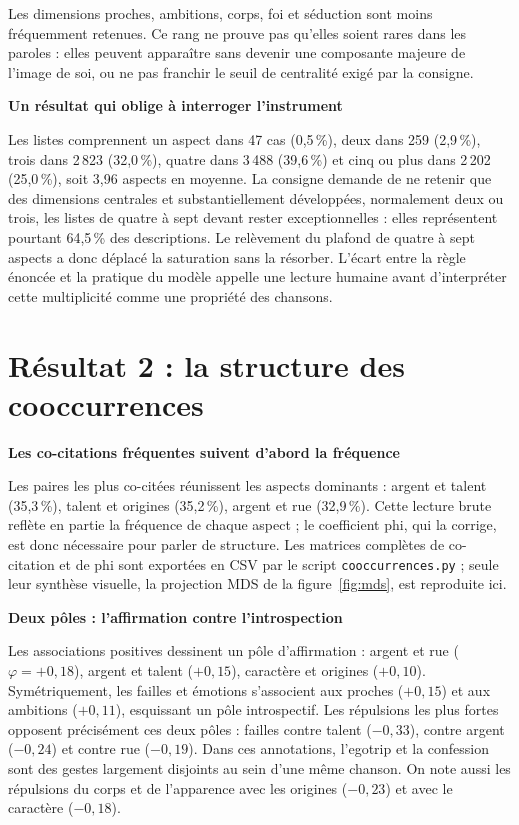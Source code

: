 \documentclass[a4paper,11pt]{article}
\newcommand{\pct}{\,\%}
\newcommand{\rubrique}[1]{\par\medskip\textbf{#1}\par}
\begin{document}
Les dimensions proches, ambitions, corps, foi et séduction sont moins
fréquemment retenues. Ce rang ne prouve pas qu'elles soient rares dans les
paroles : elles peuvent apparaître sans devenir une composante majeure de
l'image de soi, ou ne pas franchir le seuil de centralité exigé par la
consigne.

\rubrique{Un résultat qui oblige à interroger l'instrument}
Les listes comprennent un aspect dans 47 cas (0,5\pct), deux dans 259
(2,9\pct), trois dans 2\,823 (32,0\pct), quatre dans 3\,488 (39,6\pct) et
cinq ou plus dans 2\,202 (25,0\pct), soit 3,96 aspects en moyenne.
La consigne demande de ne retenir que des dimensions centrales et
substantiellement développées, normalement deux ou trois, les listes de
quatre à sept devant rester exceptionnelles : elles représentent pourtant
64,5\pct{} des descriptions. Le relèvement du plafond de quatre à sept
aspects a donc déplacé la saturation sans la résorber. L'écart entre la
règle énoncée et la pratique du modèle appelle une lecture humaine avant
d'interpréter cette multiplicité comme une propriété des chansons.

\section{Résultat 2 : la structure des cooccurrences}

\rubrique{Les co-citations fréquentes suivent d'abord la fréquence}
Les paires les plus co-citées réunissent les aspects dominants : argent et
talent (35,3\pct), talent et origines (35,2\pct), argent et rue (32,9\pct).
Cette lecture brute reflète en partie la fréquence de chaque
aspect ; le coefficient phi, qui la corrige, est donc nécessaire pour
parler de structure. Les matrices complètes de co-citation et de phi sont
exportées en CSV par le script \texttt{cooccurrences.py} ; seule leur
synthèse visuelle, la projection MDS de la figure~\ref{fig:mds}, est
reproduite ici.

\rubrique{Deux pôles : l'affirmation contre l'introspection}
Les associations positives dessinent un pôle d'affirmation : argent et
rue ($\varphi=+0{,}18$), argent et talent ($+0{,}15$), caractère et
origines ($+0{,}10$). Symétriquement, les failles et émotions s'associent
aux proches ($+0{,}15$) et aux ambitions ($+0{,}11$), esquissant un pôle
introspectif. Les répulsions les plus fortes opposent précisément ces deux
pôles : failles contre talent ($-0{,}33$), contre argent ($-0{,}24$) et
contre rue ($-0{,}19$). Dans ces annotations, l'egotrip et la confession
sont des gestes largement disjoints au sein d'une même chanson. On note
aussi les répulsions du corps et de l'apparence avec les origines
($-0{,}23$) et avec le caractère ($-0{,}18$).
\end{document}
